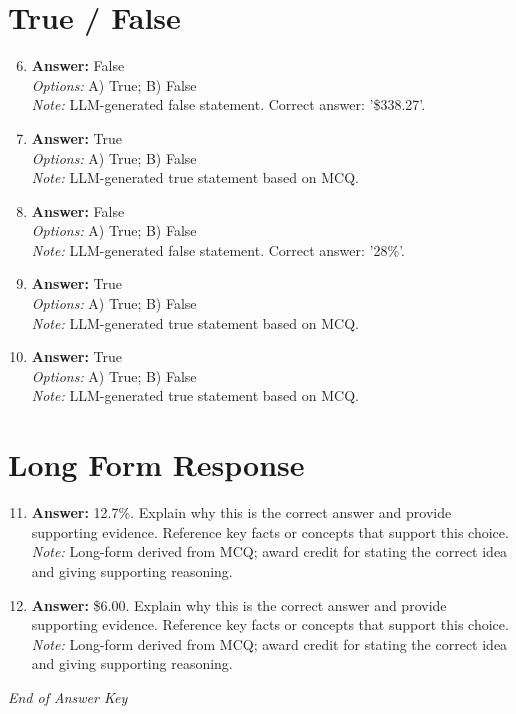 \documentclass[12pt]{article}
\begin{document}
\section*{True / False}
\begin{enumerate}[label=\arabic*.]
\setcounter{enumi}{5}
\item \textbf{Answer:} False
\\ \textit{Options:} A) True; B) False
\\ \textit{Note:} LLM-generated false statement. Correct answer: '\$338.27'.
\item \textbf{Answer:} True
\\ \textit{Options:} A) True; B) False
\\ \textit{Note:} LLM-generated true statement based on MCQ.
\item \textbf{Answer:} False
\\ \textit{Options:} A) True; B) False
\\ \textit{Note:} LLM-generated false statement. Correct answer: '28\%'.
\item \textbf{Answer:} True
\\ \textit{Options:} A) True; B) False
\\ \textit{Note:} LLM-generated true statement based on MCQ.
\item \textbf{Answer:} True
\\ \textit{Options:} A) True; B) False
\\ \textit{Note:} LLM-generated true statement based on MCQ.
\end{enumerate}

\section*{Long Form Response}
\begin{enumerate}[label=\arabic*.]
\setcounter{enumi}{10}
\item \textbf{Answer:} 12.7\%. Explain why this is the correct answer and provide supporting evidence. Reference key facts or concepts that support this choice.
\\ \textit{Note:} Long-form derived from MCQ; award credit for stating the correct idea and giving supporting reasoning.
\item \textbf{Answer:} \$6.00. Explain why this is the correct answer and provide supporting evidence. Reference key facts or concepts that support this choice.
\\ \textit{Note:} Long-form derived from MCQ; award credit for stating the correct idea and giving supporting reasoning.
\end{enumerate}

\vfill
\noindent\textit{End of Answer Key}
\end{document}
